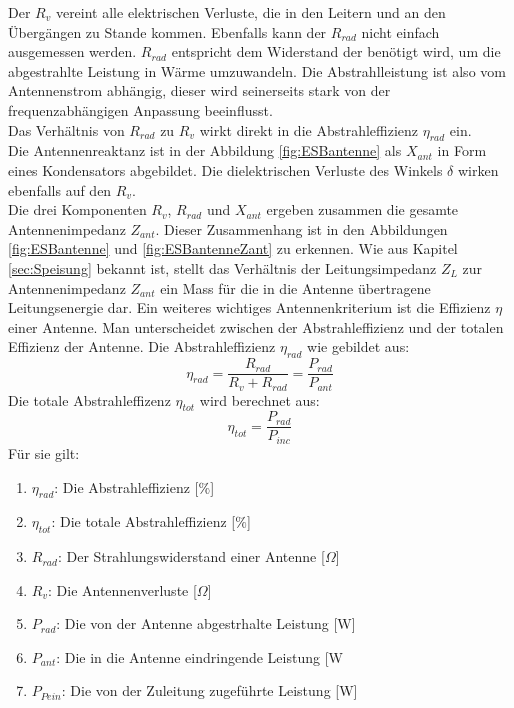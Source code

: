 \newpage
Der $R_{v}$ vereint alle elektrischen Verluste, die in den Leitern und an den Übergängen zu Stande kommen. Ebenfalls kann der $R_{rad}$ nicht einfach ausgemessen werden. $R_{rad}$ entspricht dem Widerstand der benötigt wird, um die abgestrahlte Leistung in Wärme umzuwandeln. Die Abstrahlleistung ist also vom Antennenstrom abhängig, dieser wird seinerseits stark von der frequenzabhängigen Anpassung beeinflusst.\\
Das Verhältnis von $R_{rad}$ zu $R_{v}$ wirkt direkt in die Abstrahleffizienz $\eta_{rad}$ ein. \\
Die Antennenreaktanz ist in der Abbildung \ref{fig:ESBantenne} als $X_{ant}$ in Form eines Kondensators abgebildet. Die dielektrischen Verluste des Winkels $\delta$ wirken ebenfalls auf den $R_{v}$.\\
Die drei Komponenten $R_{v}$, $R_{rad}$ und $X_{ant}$ ergeben zusammen die gesamte Antennenimpedanz $Z_{ant}$. Dieser Zusammenhang ist in den Abbildungen \ref{fig:ESBantenne} und \ref{fig:ESBantenneZant} zu erkennen. Wie aus Kapitel \ref{sec:Speisung} bekannt ist, stellt das Verhältnis der Leitungsimpedanz $Z_L$ zur Antennenimpedanz $Z_{ant}$ ein Mass für die in die Antenne übertragene Leitungsenergie dar. Ein weiteres wichtiges Antennenkriterium ist die Effizienz $\eta$ einer Antenne. Man unterscheidet zwischen der Abstrahleffizienz und der totalen Effizienz der Antenne. Die Abstrahleffizienz $\eta_{rad}$ wie gebildet aus:
\begin{equation}
\eta_{rad}=\dfrac{R_{rad}}{R_v + R_{rad}}=\dfrac{P_{rad}}{P_{ant}}
\label{eq:eta_rad}
\end{equation}
Die totale Abstrahleffizenz $\eta_{tot}$ wird berechnet aus:
\begin{equation}
\eta_{tot}=\dfrac{P_{rad}}{P_{inc}}
\label{eq:eta_tot}
\end{equation}
Für sie gilt:
\begin{enumerate}[leftmargin=2cm]
 \item[] $\eta_{rad}$: Die Abstrahleffizienz [$\%$] 
 \item[] $\eta_{tot}$: Die totale Abstrahleffizienz [$\%$] 
 \item[] $R_{rad}$: Der Strahlungswiderstand einer Antenne [$\Omega$] 
 \item[] $R_v$: Die Antennenverluste [$\Omega$] 
 \item[] $P_{rad}$: Die von der Antenne abgestrhalte Leistung [W] 
 \item[] $P_{ant}$: Die in die Antenne eindringende Leistung [W 
 \item[] $P_{Pein}$: Die von der Zuleitung zugeführte Leistung [W] 
\end{enumerate} 

